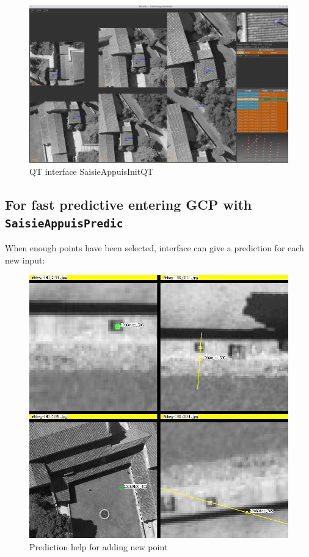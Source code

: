 \begin{figure}[H]
\begin{center}
\includegraphics[width=160mm]{FIGS/Saisie/SaisieAppuisInitQT.jpg}
\end{center}
\caption{QT interface SaisieAppuisInitQT}
\label{FIG:SaisieAppuis:QT}
\end{figure}

\subsection{For fast predictive entering GCP with {\tt SaisieAppuisPredic}}

When enough points have been selected, interface can give a prediction for each new input:

\begin{figure}[H]
\begin{center}
\includegraphics[width=120mm]{FIGS/Saisie/prediction.jpg}
\end{center}
\caption{Prediction help for adding new point}
\label{FIG:SaisieAppuis:prediction}
\end{figure}

